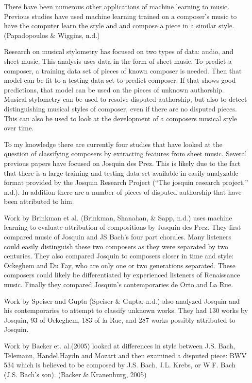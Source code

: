 \documentclass[12pt,twoside]{reedthesis}
\theoremstyle{definition}
\theoremstyle{definition}
\theoremstyle{definition}
\theoremstyle{remark}
\begin{document}
There have been numerous other applications of machine learning to
music. Previous studies have used machine learning trained on a
composer's music to have the computer learn the style and and compose a
piece in a similar style. (Papadopoulos \& Wiggins, n.d.)

Research on musical stylometry has focused on two types of data: audio,
and sheet music. This analysis uses data in the form of sheet music. To
predict a composer, a training data set of pieces of known composer is
needed. Then that model can be fit to a testing data set to predict
composer. If that shows good predictions, that model can be used on the
pieces of unknown authorship. Musical stylometry can be used to resolve
disputed authorship, but also to detect distinguishing musical styles of
composer, even if there are no disputed pieces. This can also be used to
look at the development of a composers musical style over time.

To my knowledge there are currently four studies that have looked at the
question of classifying composers by extracting features from sheet
music. Several previous papers have focused on Josquin des Prez. This is
likely due to the fact that there is a large training and testing data
set available in easily analyzable format provided by the Josquin
Research Project (``The josquin research project,'' n.d.). In addition
there are a number of pieces of disputed authorship that have been
attributed to him.

Work by Brinkman et al. (Brinkman, Shanahan, \& Sapp, n.d.) uses machine
learning to evaluate attribution of compositions by Josquin des Prez.
They first compared music of Josquin and JS Bach's four part chorales.
Many listeners could easily distinguish these two composers as they were
separated by two centuries. They also compared Josquin to composers
closer in time and style: Ockeghem and Du Fay, who are only one or two
generations separated. These composers could likely be differentiated by
experienced listeners of Renaissance music. Finally they compared
Josquin's contemporaries de Orto and La Rue.

Work by Speiser and Gupta (Speiser \& Gupta, n.d.) also analyzed Josquin
and his contemporaries to attempt to classify unknown works. They had
130 works by Josquin, 93 of Ockeghem, 183 of la Rue, and 287 works
possibly attributed to Josquin.

Work by Backer et. al.(2005) looked at differences in style between J.S.
Bach, Telemann, Handel,Haydn and Mozart and then examined a disputed
piece: BWV 534 which is believed to be composed by J.S. Bach, J.L.
Krebs, or W.F. Bach (J.S. Bach's son). (Backer \& Kranenburg, 2005)
\end{document}
